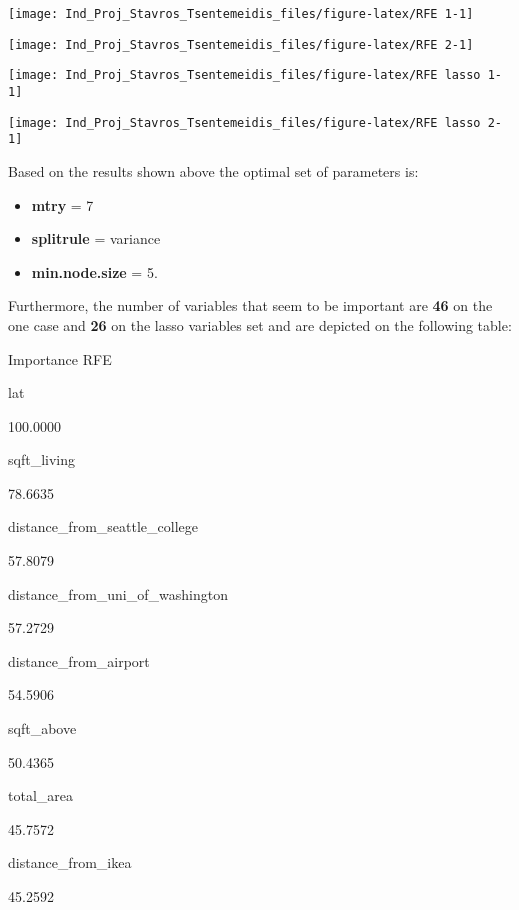 \documentclass[]{article}
\providecommand{\tightlist}{%
  \setlength{\itemsep}{0pt}\setlength{\parskip}{0pt}}
\begin{document}
\begin{center}\texttt{[image: Ind\_Proj\_Stavros\_Tsentemeidis\_files/figure-latex/RFE 1-1]} \end{center}

\begin{center}\texttt{[image: Ind\_Proj\_Stavros\_Tsentemeidis\_files/figure-latex/RFE 2-1]} \end{center}

\begin{center}\texttt{[image: Ind\_Proj\_Stavros\_Tsentemeidis\_files/figure-latex/RFE lasso 1-1]} \end{center}

\begin{center}\texttt{[image: Ind\_Proj\_Stavros\_Tsentemeidis\_files/figure-latex/RFE lasso 2-1]} \end{center}

Based on the results shown above the optimal set of parameters is:

\begin{itemize}
\tightlist
\item
  \textbf{mtry} = 7\\
\item
  \textbf{splitrule} = variance\\
\item
  \textbf{min.node.size} = 5.
\end{itemize}

Furthermore, the number of variables that seem to be important are
\textbf{46} on the one case and \textbf{26} on the lasso variables set
and are depicted on the following table:

Importance RFE

lat

100.0000

sqft\_living

78.6635

distance\_from\_seattle\_college

57.8079

distance\_from\_uni\_of\_washington

57.2729

distance\_from\_airport

54.5906

sqft\_above

50.4365

total\_area

45.7572

distance\_from\_ikea

45.2592
\end{document}
